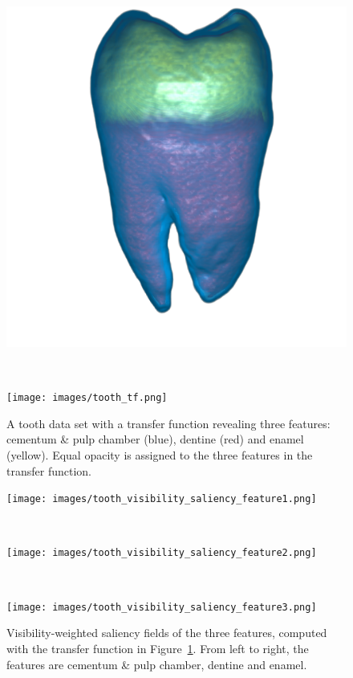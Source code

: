 \begin{figure}
	\centering
	\begin{minipage}{.6\textwidth}
		\includegraphics[width=1\linewidth]{images/tooth_naive.png}
	\end{minipage}~
	\begin{minipage}{.3\textwidth}
		\texttt{[image: images/tooth\_tf.png]}
	\end{minipage}
	\caption{A tooth data set with a transfer function revealing three features: cementum \& pulp chamber (blue), dentine (red) and enamel (yellow). Equal opacity is assigned to the three features in the transfer function.}
	\label{fig:tooth}
\end{figure}

\begin{figure}
	\centering
	\begin{minipage}{.3\textwidth}
		\texttt{[image: images/tooth\_visibility\_saliency\_feature1.png]}
	\end{minipage}~
	\begin{minipage}{.3\textwidth}
		\texttt{[image: images/tooth\_visibility\_saliency\_feature2.png]}
	\end{minipage}~
	\begin{minipage}{.3\textwidth}
		\texttt{[image: images/tooth\_visibility\_saliency\_feature3.png]}
	\end{minipage}
	\caption{Visibility-weighted saliency fields of the three features, computed with the transfer function in Figure~\ref{fig:tooth}. From left to right, the features are cementum \& pulp chamber, dentine and enamel.}
	\label{fig:tooth_saliency_field}
\end{figure}

